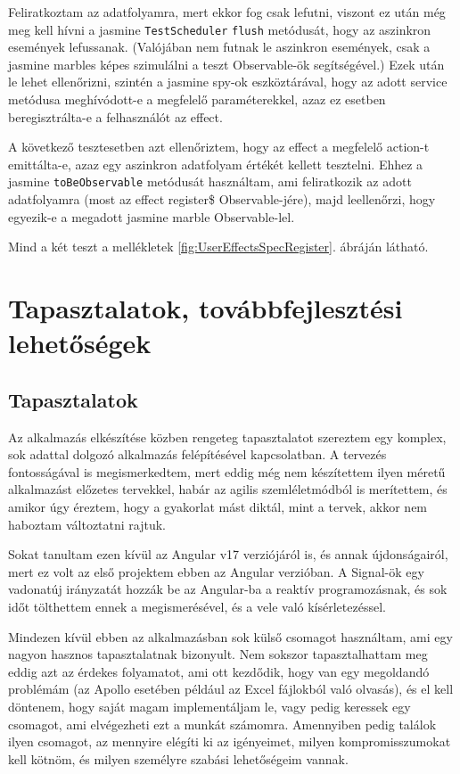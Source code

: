 \documentclass[a4paper,12pt]{report}
\begin{document}
Feliratkoztam az adatfolyamra, mert ekkor fog csak lefutni, viszont ez után még meg kell hívni a jasmine \verb|TestScheduler| \verb|flush| metódusát, hogy az aszinkron események lefussanak. (Valójában nem futnak le aszinkron események, csak a jasmine marbles képes szimulálni a teszt Observable-ök segítségével.) Ezek után le lehet ellenőrizni, szintén a jasmine spy-ok eszköztárával, hogy az adott service metódusa meghívódott-e a megfelelő paraméterekkel, azaz ez esetben beregisztrálta-e a felhasználót az effect.

A következő tesztesetben azt ellenőriztem, hogy az effect a megfelelő action-t emittálta-e, azaz egy aszinkron adatfolyam értékét kellett tesztelni. Ehhez a jasmine \verb|toBeObservable| metódusát használtam, ami feliratkozik az adott adatfolyamra (most az effect register\$ Observable-jére), majd leellenőrzi, hogy egyezik-e a megadott jasmine marble Observable-lel.

Mind a két teszt a mellékletek \ref{fig:UserEffectsSpecRegister}. ábráján látható.

\chapter{Tapasztalatok, továbbfejlesztési lehetőségek}

\section{Tapasztalatok}

Az alkalmazás elkészítése közben rengeteg tapasztalatot szereztem egy komplex, sok adattal dolgozó alkalmazás felépítésével kapcsolatban. A tervezés fontosságával is megismerkedtem, mert eddig még nem készítettem ilyen méretű alkalmazást előzetes tervekkel, habár az agilis szemléletmódból is merítettem, és amikor úgy éreztem, hogy a gyakorlat mást diktál, mint a tervek, akkor nem haboztam változtatni rajtuk.

Sokat tanultam ezen kívül az Angular v17 verziójáról is, és annak újdonságairól, mert ez volt az első projektem ebben az Angular verzióban. A Signal-ök \cite{angular-signals} egy vadonatúj irányzatát hozzák be az Angular-ba a reaktív programozásnak, és sok időt tölthettem ennek a megismerésével, és a vele való kísérletezéssel.

Mindezen kívül ebben az alkalmazásban sok külső csomagot használtam, ami egy nagyon hasznos tapasztalatnak bizonyult. Nem sokszor tapasztalhattam meg eddig azt az érdekes folyamatot, ami ott kezdődik, hogy van egy megoldandó problémám (az Apollo esetében például az Excel fájlokból való olvasás), és el kell döntenem, hogy saját magam implementáljam le, vagy pedig keressek egy csomagot, ami elvégezheti ezt a munkát számomra. Amennyiben pedig találok ilyen csomagot, az mennyire elégíti ki az igényeimet, milyen kompromisszumokat kell kötnöm, és milyen személyre szabási lehetőségeim vannak.
\end{document}
